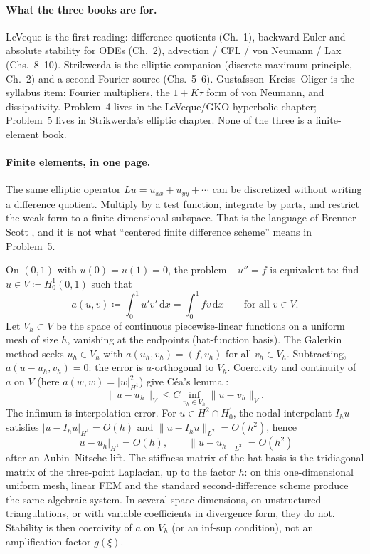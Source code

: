 \documentclass[11pt,a4paper]{article}
\begin{document}
\paragraph{What the three books are for.}

LeVeque \cite{leveque07} is the first reading: difference quotients (Ch.~1), backward Euler and absolute stability for ODEs (Ch.~2), advection / CFL / von Neumann / Lax (Chs.~8--10). Strikwerda \cite{strikwerda04} is the elliptic companion (discrete maximum principle, Ch.~2) and a second Fourier source (Chs.~5--6). Gustafsson--Kreiss--Oliger \cite{gko95} is the syllabus item: Fourier multipliers, the \(1+K\tau\) form of von Neumann, and dissipativity. Problem~4 lives in the LeVeque/GKO hyperbolic chapter; Problem~5 lives in Strikwerda's elliptic chapter. None of the three is a finite-element book.

\paragraph{Finite elements, in one page.}

The same elliptic operator \(Lu=u_{xx}+u_{yy}+\cdots\) can be discretized without writing a difference quotient. Multiply by a test function, integrate by parts, and restrict the weak form to a finite-dimensional subspace. That is the language of Brenner--Scott \cite{brennerscott10}, and it is not what ``centered finite difference scheme'' means in Problem~5.

\begin{example}
\label{ex:fem-poisson}
On \((0,1)\) with \(u(0)=u(1)=0\), the problem \(-u''=f\) is equivalent to: find \(u\in V\coloneqq H_0^1(0,1)\) such that
\[
a(u,v)
\coloneqq
\int_0^1 u'v'\,\mathrm{d}x
=
\int_0^1 fv\,\mathrm{d}x
\qquad
\text{for all }v\in V.
\]
Let \(V_h\subset V\) be the space of continuous piecewise-linear functions on a uniform mesh of size \(h\), vanishing at the endpoints (hat-function basis). The Galerkin method seeks \(u_h\in V_h\) with \(a(u_h,v_h)=(f,v_h)\) for all \(v_h\in V_h\). Subtracting, \(a(u-u_h,v_h)=0\): the error is \(a\)-orthogonal to \(V_h\). Coercivity and continuity of \(a\) on \(V\) (here \(a(w,w)=\lvert w\rvert_{H^1}^2\)) give C\'ea's lemma \cite{brennerscott10}:
\[
\|u-u_h\|_V
\le
C\inf_{v_h\in V_h}\|u-v_h\|_V.
\]
The infimum is interpolation error. For \(u\in H^2\cap H_0^1\), the nodal interpolant \(I_h u\) satisfies \(\lvert u-I_h u\rvert_{H^1}=O(h)\) and \(\|u-I_h u\|_{L^2}=O(h^2)\), hence
\[
\lvert u-u_h\rvert_{H^1}=O(h),
\qquad
\|u-u_h\|_{L^2}=O(h^2)
\]
after an Aubin--Nitsche lift. The stiffness matrix of the hat basis is the tridiagonal matrix of the three-point Laplacian, up to the factor \(h\): on this one-dimensional uniform mesh, linear FEM and the standard second-difference scheme produce the same algebraic system. In several space dimensions, on unstructured triangulations, or with variable coefficients in divergence form, they do not. Stability is then coercivity of \(a\) on \(V_h\) (or an inf-sup condition), not an amplification factor \(g(\xi)\).
\end{example}
\end{document}
